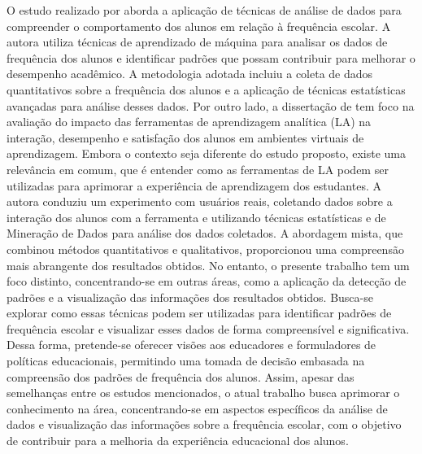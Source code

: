O estudo realizado por  aborda a aplicação de técnicas de análise de dados para compreender o comportamento dos alunos em relação à frequência escolar. A autora utiliza técnicas de aprendizado de máquina para analisar os dados de frequência dos alunos e identificar padrões que possam contribuir para melhorar o desempenho acadêmico. A metodologia adotada incluiu a coleta de dados quantitativos sobre a frequência dos alunos e a aplicação de técnicas estatísticas avançadas para análise desses dados. Por outro lado, a dissertação de  tem foco na avaliação do impacto das ferramentas de aprendizagem analítica (LA) na interação, desempenho e satisfação dos alunos em ambientes virtuais de aprendizagem. Embora o contexto seja diferente do estudo proposto, existe uma relevância em comum, que é entender como as ferramentas de LA podem ser utilizadas para aprimorar a experiência de aprendizagem dos estudantes. A autora conduziu um experimento com usuários reais, coletando dados sobre a interação dos alunos com a ferramenta e utilizando técnicas estatísticas e de Mineração de Dados para análise dos dados coletados. A abordagem mista, que combinou métodos quantitativos e qualitativos, proporcionou uma compreensão mais abrangente dos resultados obtidos. No entanto, o presente trabalho tem um foco distinto, concentrando-se em outras áreas, como a aplicação da detecção de padrões e a visualização das informações dos resultados obtidos. Busca-se explorar como essas técnicas podem ser utilizadas para identificar padrões de frequência escolar e visualizar esses dados de forma compreensível e significativa. Dessa forma, pretende-se oferecer visões aos educadores e formuladores de políticas educacionais, permitindo uma tomada de decisão embasada na compreensão dos padrões de frequência dos alunos. Assim, apesar das semelhanças entre os estudos mencionados, o atual trabalho busca aprimorar o conhecimento na área, concentrando-se em aspectos específicos da análise de dados e visualização das informações sobre a frequência escolar, com o objetivo de contribuir para a melhoria da experiência educacional dos alunos.

